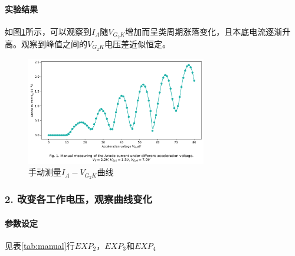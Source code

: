 \documentclass[12pt,a4paper,UTF8]{ctexart}
\begin{document}
		\paragraph{实验结果}如图\ref{fig:1}所示，可以观察到$I_A$随$V_{G_2K}$增加而呈类周期涨落变化，且本底电流逐渐升高。观察到峰值之间的$V_{G_2K}$电压差近似恒定。
		\begin{figure}[htbp]
			\centering
			\includegraphics[width=0.7\textwidth]{attachments/fig.1.png}
			\caption{手动测量$I_A-V_{G_2K}$曲线}
			\label{fig:1}
		\end{figure}
	\subsubsection*{2. 改变各工作电压，观察曲线变化}
		\paragraph{参数设定}见表\ref{tab:manual}行$EXP_2$，$EXP_3$和$EXP_4$
\end{document}
